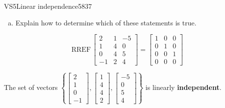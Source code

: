 \begin{exercise}{VS5}{Linear independence}{5837}
\begin{exerciseStatement}
\begin{enumerate}[(a)]
     
\item  

 Explain how to determine which of these statements is true. 

 
\end{enumerate}

     \end{exerciseStatement}
 \begin{exerciseAnswer} 

 \[
\mathrm{RREF}\, \left[\begin{array}{ccc}
2 & 1 & -5 \\
1 & 4 & 0 \\
0 & 4 & 5 \\
-1 & 2 & 4
\end{array}\right] = \left[\begin{array}{ccc}
1 & 0 & 0 \\
0 & 1 & 0 \\
0 & 0 & 1 \\
0 & 0 & 0
\end{array}\right]
            \] 

 

 The set of vectors \(\left\{ \left[\begin{array}{c}
2 \\
1 \\
0 \\
-1
\end{array}\right] , \left[\begin{array}{c}
1 \\
4 \\
4 \\
2
\end{array}\right] , \left[\begin{array}{c}
-5 \\
0 \\
5 \\
4
\end{array}\right] \right\}\) is linearly \textbf{independent}. 

 \end{exerciseAnswer}
 \end{exercise}


